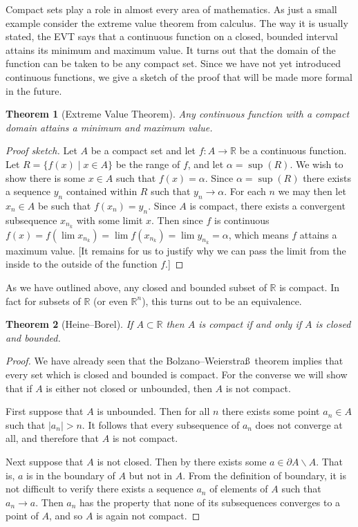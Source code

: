 \documentclass[11pt,oneside]{amsbook}
\newcommand{\R}{\mathbb R}
\renewcommand{\setminus}{\smallsetminus}
\theoremstyle{definition}
\theoremstyle{plain}
\newtheorem{theorem}{Theorem}[section]
\theoremstyle{definition}
\theoremstyle{remark}
\numberwithin{equation}{section}
\numberwithin{figure}{section}
\begin{document}
Compact sets play a role in almost every area of mathematics. As just a small example consider the extreme value theorem from calculus. The way it is usually stated, the EVT says that a continuous function on a closed, bounded interval attains its minimum and maximum value. It turns out that the domain of the function can be taken to be any compact set. Since we have not yet introduced continuous functions, we give a sketch of the proof that will be made more formal in the future.

\begin{theorem}[Extreme Value Theorem]
  Any continuous function with a compact domain attains a minimum and maximum value.
\end{theorem}

\begin{proof}[Proof sketch]
  Let $A$ be a compact set and let $f\colon A\to\R$ be a continuous function. Let $R=\{f(x)\mid x\in A\}$ be the range of $f$, and let $\alpha=\sup(R)$. We wish to show there is some $x\in A$ such that $f(x)=\alpha$. Since $\alpha=\sup(R)$ there exists a sequence $y_n$ contained within $R$ such that $y_n\to\alpha$. For each $n$ we may then let $x_n\in A$ be such that $f(x_n)=y_n$. Since $A$ is compact, there exists a convergent subsequence $x_{n_k}$ with some limit $x$. Then since $f$ is continuous $f(x)=f(\lim x_{n_k})=\lim f(x_{n_k})=\lim y_{n_k}=\alpha$, which means $f$ attains a maximum value. [It remains for us to justify why we can pass the limit from the inside to the outside of the function $f$.]
\end{proof}

As we have outlined above, any closed and bounded subset of $\R$ is compact. In fact for subsets of $\R$ (or even $\R^n$), this turns out to be an equivalence.

\begin{theorem}[Heine--Borel]
  If $A\subset\R$ then $A$ is compact if and only if $A$ is closed and bounded.
\end{theorem}

\begin{proof}
  We have already seen that the Bolzano--Weierstra\ss\ theorem implies that every set which is closed and bounded is compact. For the converse we will show that if $A$ is either not closed or unbounded, then $A$ is not compact.

  First suppose that $A$ is unbounded. Then for all $n$ there exists some point $a_n\in A$ such that $|a_n|>n$. It follows that every subsequence of $a_n$ does not converge at all, and therefore that $A$ is not compact.

  Next suppose that $A$ is not closed. Then by there exists some $a\in\partial A\setminus A$. That is, $a$ is in the boundary of $A$ but not in $A$. From the definition of boundary, it is not difficult to verify there exists a sequence $a_n$ of elements of $A$ such that $a_n\to a$. Then $a_n$ has the property that none of its subsequences converges to a point of $A$, and so $A$ is again not compact.
\end{proof}
\end{document}
